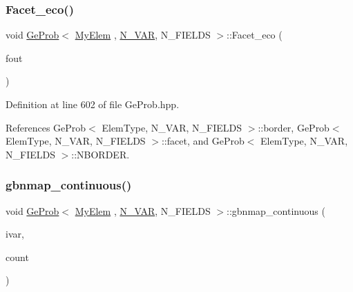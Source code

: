 \mbox{\label{classGeProb_ae30b85570c7c33bb4429f9ed91532807}} 
\subsubsection{\texorpdfstring{Facet\+\_\+eco()}{Facet\_eco()}}
{\footnotesize\ttfamily void \hyperlink{classGeProb}{Ge\+Prob}$<$ \hyperlink{DG__Prob_8h_a83cd887ced9a6587428f267e50cd4787}{My\+Elem} , \hyperlink{classED__Prob_a4e7d2ff1a8e435e336fb00c527224b5a}{N\+\_\+\+V\+AR}, N\+\_\+\+F\+I\+E\+L\+DS $>$\+::Facet\+\_\+eco (\begin{DoxyParamCaption}\item[{F\+I\+LE $\ast$}]{fout }\end{DoxyParamCaption})\hspace{0.3cm}{\ttfamily [inherited]}}



Definition at line 602 of file Ge\+Prob.\+hpp.



References Ge\+Prob$<$ Elem\+Type, N\+\_\+\+V\+A\+R, N\+\_\+\+F\+I\+E\+L\+D\+S $>$\+::border, Ge\+Prob$<$ Elem\+Type, N\+\_\+\+V\+A\+R, N\+\_\+\+F\+I\+E\+L\+D\+S $>$\+::facet, and Ge\+Prob$<$ Elem\+Type, N\+\_\+\+V\+A\+R, N\+\_\+\+F\+I\+E\+L\+D\+S $>$\+::\+N\+B\+O\+R\+D\+ER.

\mbox{\label{classGeProb_aa2d34febad6985ceacd95ba6e10536f8}} 
\subsubsection{\texorpdfstring{gbnmap\+\_\+continuous()}{gbnmap\_continuous()}\hspace{0.1cm}{\footnotesize\ttfamily [1/2]}}
{\footnotesize\ttfamily void \hyperlink{classGeProb}{Ge\+Prob}$<$ \hyperlink{DG__Prob_8h_a83cd887ced9a6587428f267e50cd4787}{My\+Elem} , \hyperlink{classED__Prob_a4e7d2ff1a8e435e336fb00c527224b5a}{N\+\_\+\+V\+AR}, N\+\_\+\+F\+I\+E\+L\+DS $>$\+::gbnmap\+\_\+continuous (\begin{DoxyParamCaption}\item[{const int \&}]{ivar,  }\item[{int \&}]{count }\end{DoxyParamCaption})\hspace{0.3cm}{\ttfamily [inherited]}}



